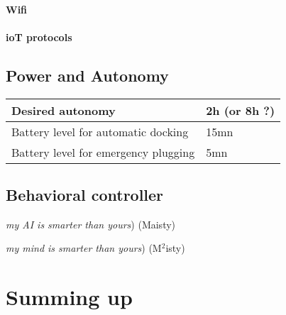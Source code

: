 \documentclass{report}
\begin{document}
\paragraph{Wifi}
\paragraph{ioT protocols}

\subsection{Power and Autonomy}

\begin{center}
  \begin{tabular}{l | l }
    Desired autonomy & 2h (or 8h ?)\\ \hline
    Battery level for automatic docking  & 15mn\\ \hline
    Battery level for emergency plugging  & 5mn\\
  \end{tabular}
\end{center}

\subsection{Behavioral controller}

\emph{my AI is smarter than yours}) (Maisty)

\emph{my mind is smarter than yours}) (M$^2$isty)

\section{Summing up}
\end{document}
